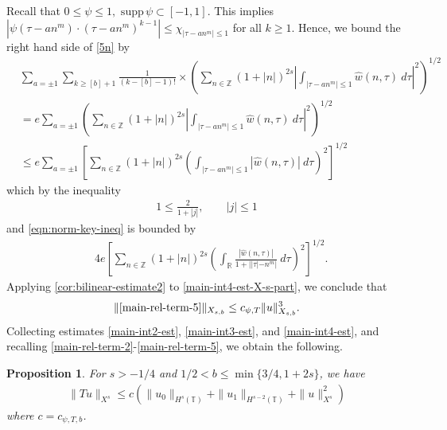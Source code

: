 \documentclass[12pt,reqno]{amsart}
\numberwithin{equation}{section}  %
\numberwithin{figure}{section}
\newcommand{\rr}{\mathbb{R}}
\newcommand{\zz}{\mathbb{Z}}
\newcommand{\ci}{\mathbb{T}}
\newcommand{\wh}{\widehat}
\theoremstyle{plain}
\newtheorem{proposition}{Proposition}
\theoremstyle{definition}
\theoremstyle{remark}
\begin{document}
%
Recall that $0 \le \psi \le 1, \text{ supp} \, \psi \subset [-1,1 ]$. 
This implies $| \psi\left( \tau - an^{m } \right) \cdot \left( \tau - an^{m } \right)^{k 
-1} | \le \chi_{| \tau - an^{m } | \le 1}$ for all $k \ge 1$. Hence, we bound the
right hand side of \eqref{5n} by
%
\begin{equation*}
	\begin{split}
    & \sum_{a = \pm 1}
    \sum_{k \ge [b] +1} \frac{1}{(k-[b] - 1)!}
    \times \left( \sum_{n \in \zz} (1 + | n |)^{2s}| 
		\int_{| \tau - an^{m}  |\le 1}  \wh{w}(n, \tau) \ d \tau |^2 
		\right)^{1/2}
    \\
    & = e \sum_{a = \pm 1} \left( \sum_{n \in \zz} (1 + | n |)^{2s}| 
		\int_{| \tau - an^{m}  |\le 1}  \wh{w}(n, \tau) \ d \tau |^2 
		\right)^{1/2}
    \\
    & \le e \sum_{a = \pm 1}
\left[ \sum_{n \in \zz} (1 + | n |)^{2s}\left (  
		\int_{| \tau - an^{m}  |\le 1} | \wh{w}(n, \tau) | \ d \tau \right ) ^2 
		\right]^{1/2}
	\end{split}
\end{equation*}
%
which by the inequality
%
\begin{equation*}
	\begin{split}
		1 \le 
		\frac{2}{1 + | j |}, \qquad | j | \le 1
	\end{split}
\end{equation*}
%
and \eqref{eqn:norm-key-ineq}
is bounded by 
%
\begin{equation}
\label{main-int4-est-X-s-part}
	\begin{split}
		& 4e \left[ \sum_{n \in \zz} (1 + | n |)^{2s}\left ( \int_\rr
		\frac{|\wh{w}(n, \tau)|}{1 + | |\tau| - n^{m } |} \ d \tau \right ) ^2 
		\right]^{1/2}.
  \end{split}
\end{equation}
%
Applying \autoref{cor:bilinear-estimate2} to \eqref{main-int4-est-X-s-part}, we
conclude that
%
%
\begin{equation}
\label{main-int4-est}
	\begin{split}
    \|\eqref{main-rel-term-5}\|_{X_{s,b}} \le c_{\psi, T} \|u\|_{X_{s,b}}^{3}.
	\end{split}
\end{equation}
%
%
Collecting estimates \eqref{main-int2-est}, 
\eqref{main-int3-est}, and \eqref{main-int4-est}, and recalling 
\eqref{main-rel-term-2}-\eqref{main-rel-term-5}, we obtain the following. 
%
%
\begin{proposition}
\label{prop:contraction}
For $s > -1/4$ and  $1/2 < b \le \min \{ 3/4, 1 + 2s \}$, we have 
%
\begin{equation*}
	\begin{split}
    \|Tu\|_{X^{s}} \le c
    \left( \|u_0 \|_{H^s(\ci)} + \|u_1 \|_{H^{s-2}(\ci)}
    + \|u\|_{X^{s}}^2 
		\right)
	\end{split}
\end{equation*}
%
where $c = c_{\psi, T, b}$.  
\end{proposition}
\end{document}
